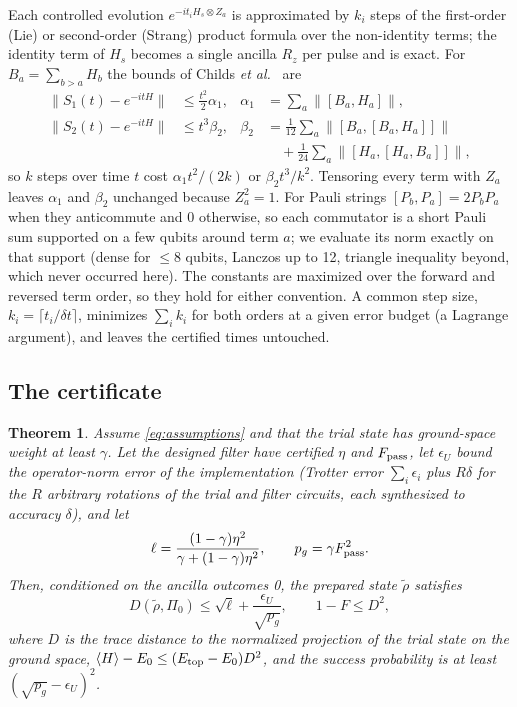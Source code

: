 \documentclass[aps,pra,twocolumn,superscriptaddress,nofootinbib]{revtex4-2}
\newtheorem{theorem}{Theorem}
\newcommand{\norm}[1]{\lVert#1\rVert}
\begin{document}
Each controlled evolution $e^{-it_iH_s\otimes Z_a}$ is approximated by $k_i$ steps of the first-order
(Lie) or second-order (Strang) product formula over the non-identity terms; the identity term of $H_s$
becomes a single ancilla $R_z$ per pulse and is exact. For $B_a=\sum_{b>a}H_b$ the bounds of Childs
\emph{et al.}~\cite[Props.~15--16]{Childs2021} are
\begin{align}
\norm{S_1(t)-e^{-itH}}&\le\tfrac{t^2}{2}\alpha_1,&\alpha_1&=\textstyle\sum_a\norm{[B_a,H_a]},\\
\norm{S_2(t)-e^{-itH}}&\le t^3\beta_2,&\beta_2&=\textstyle\frac1{12}\sum_a\norm{[B_a,[B_a,H_a]]}\nonumber\\
&&&\quad+\textstyle\frac1{24}\sum_a\norm{[H_a,[H_a,B_a]]},
\end{align}
so $k$ steps over time $t$ cost $\alpha_1t^2/(2k)$ or $\beta_2t^3/k^2$. Tensoring every term with
$Z_a$ leaves $\alpha_1$ and $\beta_2$ unchanged because $Z_a^2=1$. For Pauli strings
$[P_b,P_a]=2P_bP_a$ when they anticommute and 0 otherwise, so each commutator is a short Pauli sum
supported on a few qubits around term $a$; we evaluate its norm exactly on that support (dense for
$\le8$ qubits, Lanczos up to 12, triangle inequality beyond, which never occurred here). The
constants are maximized over the forward and reversed term order, so they hold for either convention.
A common step size, $k_i=\lceil t_i/\delta t\rceil$, minimizes $\sum_ik_i$ for both orders at a given
error budget (a Lagrange argument), and leaves the certified times untouched.

\subsection{The certificate}

\begin{theorem}\label{thm:cert}
Assume \eqref{eq:assumptions} and that the trial state has ground-space weight at least $\gamma$. Let
the designed filter have certified $\eta$ and $F_{\rm pass}$, let $\epsilon_U$ bound the operator-norm
error of the implementation (Trotter error $\sum_i\epsilon_i$ plus $R\delta$ for the $R$ arbitrary
rotations of the trial and filter circuits, each synthesized to accuracy $\delta$), and let
\begin{equation}
\ell=\frac{(1-\gamma)\eta^2}{\gamma+(1-\gamma)\eta^2},\qquad p_g=\gamma F_{\rm pass}^2 .
\end{equation}
Then, conditioned on the ancilla outcomes 0, the prepared state $\tilde\rho$ satisfies
\begin{equation}
D(\tilde\rho,\Pi_0)\le\sqrt\ell+\frac{\epsilon_U}{\sqrt{p_g}},\qquad 1-F\le D^2,
\label{eq:cert}
\end{equation}
where $D$ is the trace distance to the normalized projection of the trial state on the ground space,
$\langle H\rangle-E_0\le(E_{\rm top}-E_0)D^2$, and the success probability is at least
$(\sqrt{p_g}-\epsilon_U)^2$.
\end{theorem}
\end{document}
